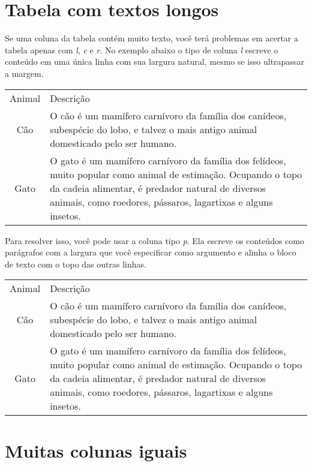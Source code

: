 \documentclass[brazilian]{article}
\begin{document}
\section{Tabela com textos longos}

Se uma coluna da tabela contém muito texto, você terá problemas em acertar a tabela apenas com \emph{l}, \emph{c} e \emph{r}. No exemplo abaixo o tipo de coluna \emph{l} escreve o conteúdo em uma única linha com sua largura natural, mesmo se isso ultrapassar a margem. \\

\begin{tabular}{cl}
    Animal & Descrição \\
    Cão    & O cão é um mamífero carnívoro da família dos canídeos, subespécie do
             lobo, e talvez o mais antigo animal domesticado pelo ser humano. \\
    Gato   & O gato é um mamífero carnívoro da família dos felídeos, muito popular
             como animal de estimação. Ocupando o topo da cadeia alimentar, é
             predador natural de diversos animais, como roedores, pássaros,
             lagartixas e alguns insetos. \\
\end{tabular}

\vspace{10pt}

Para resolver isso, você pode usar a coluna tipo \emph{p}. Ela escreve os conteúdos como parágrafos com a largura que você especificar como argumento e alinha o bloco de texto com o topo das outras linhas.\\

\begin{tabular}{cp{9cm}}
    Animal & Descrição \\
    Cão    & O cão é um mamífero carnívoro da família dos canídeos, subespécie do
             lobo, e talvez o mais antigo animal domesticado pelo ser humano. \\
    Gato   & O gato é um mamífero carnívoro da família dos felídeos, muito popular
             como animal de estimação. Ocupando o topo da cadeia alimentar, é
             predador natural de diversos animais, como roedores, pássaros,
             lagartixas e alguns insetos. \\
\end{tabular}

\section{Muitas colunas iguais}
    
\end{document}
